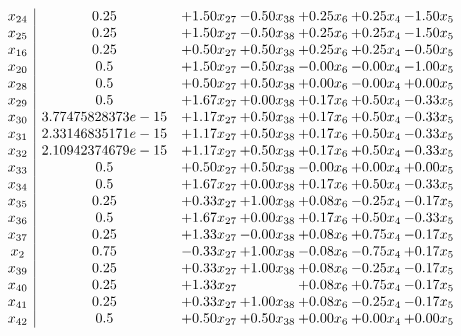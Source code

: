 \documentclass[8pt]{article}
\begin{document}
\[\begin{array}{c| c c@{\hskip 2pt} c@{\hskip 2pt} c@{\hskip 2pt} c@{\hskip 2pt} c@{\hskip 2pt} }
 x_{24}   &  0.25 & +  1.50 x_{27} & -0.50 x_{38} & +  0.25 x_{6} & +  0.25 x_{4} & -1.50 x_{5}\\
 x_{25}   &  0.25 & +  1.50 x_{27} & -0.50 x_{38} & +  0.25 x_{6} & +  0.25 x_{4} & -1.50 x_{5}\\
 x_{16}   &  0.25 & +  0.50 x_{27} & +  0.50 x_{38} & +  0.25 x_{6} & +  0.25 x_{4} & -0.50 x_{5}\\
 x_{20}   &  0.5 & +  1.50 x_{27} & -0.50 x_{38} & -0.00 x_{6} & -0.00 x_{4} & -1.00 x_{5}\\
 x_{28}   &  0.5 & +  0.50 x_{27} & +  0.50 x_{38} & +  0.00 x_{6} & -0.00 x_{4} & +  0.00 x_{5}\\
 x_{29}   &  0.5 & +  1.67 x_{27} & +  0.00 x_{38} & +  0.17 x_{6} & +  0.50 x_{4} & -0.33 x_{5}\\
 x_{30}   &  3.77475828373e-15 & +  1.17 x_{27} & +  0.50 x_{38} & +  0.17 x_{6} & +  0.50 x_{4} & -0.33 x_{5}\\
 x_{31}   &  2.33146835171e-15 & +  1.17 x_{27} & +  0.50 x_{38} & +  0.17 x_{6} & +  0.50 x_{4} & -0.33 x_{5}\\
 x_{32}   &  2.10942374679e-15 & +  1.17 x_{27} & +  0.50 x_{38} & +  0.17 x_{6} & +  0.50 x_{4} & -0.33 x_{5}\\
 x_{33}   &  0.5 & +  0.50 x_{27} & +  0.50 x_{38} & -0.00 x_{6} & +  0.00 x_{4} & +  0.00 x_{5}\\
 x_{34}   &  0.5 & +  1.67 x_{27} & +  0.00 x_{38} & +  0.17 x_{6} & +  0.50 x_{4} & -0.33 x_{5}\\
 x_{35}   &  0.25 & +  0.33 x_{27} & +  1.00 x_{38} & +  0.08 x_{6} & -0.25 x_{4} & -0.17 x_{5}\\
 x_{36}   &  0.5 & +  1.67 x_{27} & +  0.00 x_{38} & +  0.17 x_{6} & +  0.50 x_{4} & -0.33 x_{5}\\
 x_{37}   &  0.25 & +  1.33 x_{27} & -0.00 x_{38} & +  0.08 x_{6} & +  0.75 x_{4} & -0.17 x_{5}\\
 x_{2}   &  0.75 & -0.33 x_{27} & +  1.00 x_{38} & -0.08 x_{6} & -0.75 x_{4} & +  0.17 x_{5}\\
 x_{39}   &  0.25 & +  0.33 x_{27} & +  1.00 x_{38} & +  0.08 x_{6} & -0.25 x_{4} & -0.17 x_{5}\\
 x_{40}   &  0.25 & +  1.33 x_{27} &   & +  0.08 x_{6} & +  0.75 x_{4} & -0.17 x_{5}\\
 x_{41}   &  0.25 & +  0.33 x_{27} & +  1.00 x_{38} & +  0.08 x_{6} & -0.25 x_{4} & -0.17 x_{5}\\
 x_{42}   &  0.5 & +  0.50 x_{27} & +  0.50 x_{38} & +  0.00 x_{6} & +  0.00 x_{4} & +  0.00 x_{5}\\

\end{array}\]
\end{document}
